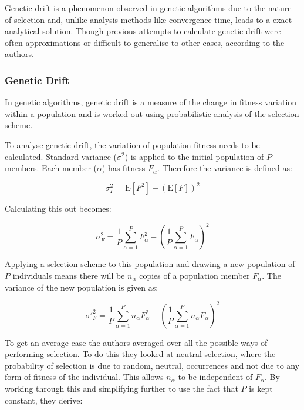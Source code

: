 \documentclass[10pt, a4paper]{article}
\begin{document}
Genetic drift is a phenomenon observed in genetic algorithms due to the nature
of selection and, unlike analysis methods like convergence time, leads to a
exact analytical solution. Though previous attempts to calculate genetic drift
were often approximations or difficult to generalise to other cases, according
to the authors.

\subsubsection{Genetic Drift} 
In genetic algorithms, genetic drift is a measure of the change in fitness
variation within a population and is worked out using probabilistic analysis of
the selection scheme. 

To analyse genetic drift, the variation of population fitness needs to be
calculated. Standard variance ($\sigma^2$) is applied to the initial population
of $P$ members. Each member ($\alpha$) has fitness $F_\alpha$. Therefore the
variance is defined as:

\begin{equation}
\sigma_F^2 = \text{E}[F^2] - (\text{E}[F])^2
\end{equation}

Calculating this out becomes:

\begin{equation}
\sigma_F^2 = \frac{1}{P}\sum^{P}_{\alpha=1}{F^{2}_{\alpha}} - \left(
\frac{1}{P}\sum^{P}_{\alpha=1}{F_{\alpha}}\right)^2
\end{equation}

Applying a selection scheme to this population and drawing a new population of
$P$ individuals means there will be $n_\alpha$ copies of a population member
$F_\alpha$. The variance of the new population is given as:

\begin{equation}
\sigma'^2_F = \frac{1}{P} \sum^{P}_{\alpha=1}{n_\alpha F^2_\alpha} - \left(
\frac{1}{P} \sum^P_{\alpha=1}{n_\alpha F_\alpha}\right)^2
\end{equation}

To get an average case the authors averaged over all the possible ways of
performing selection. To do this they looked at neutral selection, where the
probability of selection is due to random, neutral, occurrences and not due to
any form of fitness of the individual. This allows $n_\alpha$ to be independent
of $F_\alpha$. By working through this and simplifying further to use the fact
that $P$ is kept constant, they derive:
\end{document}
